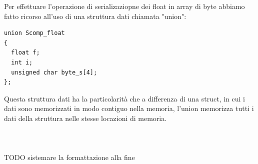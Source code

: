 \documentclass[10pt,a4paper]{article}
\begin{document}
Per effettuare l'operazione di serializaziopne dei float in array di byte abbiamo fatto ricorso all'uso di una struttura dati chiamata "union":
\begin{lstlisting}[style=myArduino, caption=classe "serial", captionpos=b]
union Scomp_float
{
  float f;
  int i;
  unsigned char byte_s[4];
};
\end{lstlisting}
Questa struttura dati ha la particolarit\`a che a differenza di una struct, in cui i dati sono memorizzati in modo contiguo nella memoria, l'union memorizza tutti i dati della struttura nelle stesse locazioni di memoria.
\\ \\ \\ \\ 

TODO sistemare la formattazione alla fine

\newsavebox{\mylistingboxstruct}
\newsavebox{\mylistingboxunion}

\newsavebox{\mytikzboxonestruct}
\newsavebox{\mytikzboxtwounion}
\end{document}
